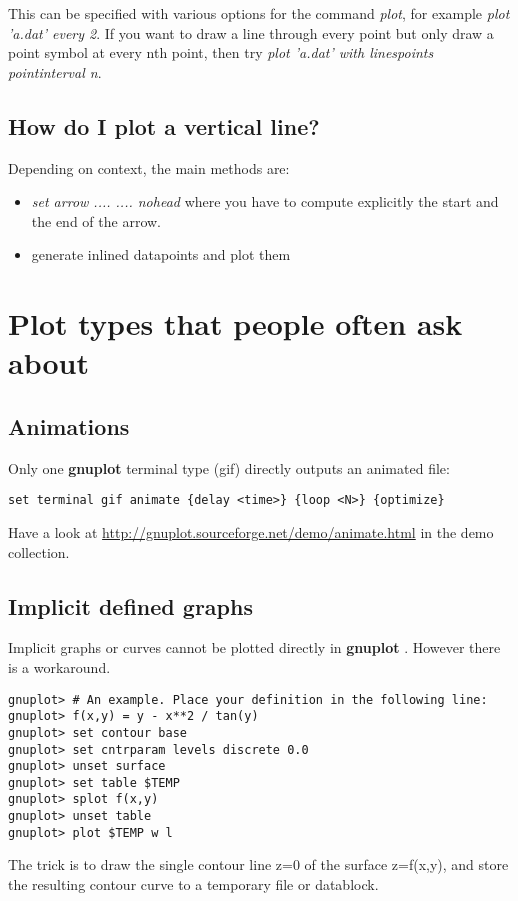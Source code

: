 \documentclass[a4paper,11pt]{article}
\def\http#1{{\small\href{http://#1}{\url{http://#1}}}}
\newcommand{\http}[1]%
            {\htmladdnormallink{\latex{\url{http://#1}}%
                    \html{\textit{http://#1}}}%
                {http://#1}%
            }
\newcommand{\gnuplot}{\textbf{gnuplot }}
\begin{document}
This can be specified with various options for the command {\em plot},
for example {\em plot 'a.dat' every 2}.  If you want to draw a line
through every point but only draw a point symbol at every nth point,
then try {\em plot 'a.dat' with linespoints pointinterval n}.


\subsection{How do I plot a vertical line?}

Depending on context, the main methods are:
\begin{itemize}
\item {\em set arrow .... .... nohead} where you have to compute
explicitly the start and the end of the arrow.
\item generate inlined datapoints and plot them
\end{itemize}


\section{Plot types that people often ask about}

\subsection{Animations}

Only one \gnuplot terminal type (gif) directly outputs an animated file:
\begin{verbatim}
set terminal gif animate {delay <time>} {loop <N>} {optimize}
\end{verbatim}

Have a look at
\http{gnuplot.sourceforge.net/demo/animate.html}
in the demo collection.

\subsection{Implicit defined graphs}

Implicit graphs or curves cannot be plotted directly in \gnuplot.
However there is a workaround.
\small
\begin{verbatim}
gnuplot> # An example. Place your definition in the following line:
gnuplot> f(x,y) = y - x**2 / tan(y)
gnuplot> set contour base
gnuplot> set cntrparam levels discrete 0.0
gnuplot> unset surface
gnuplot> set table $TEMP
gnuplot> splot f(x,y)
gnuplot> unset table
gnuplot> plot $TEMP w l
\end{verbatim}
\normalsize
The trick is to draw the single contour line z=0 of the surface
z=f(x,y), and store the resulting contour curve to a temporary file or datablock.
\end{document}
